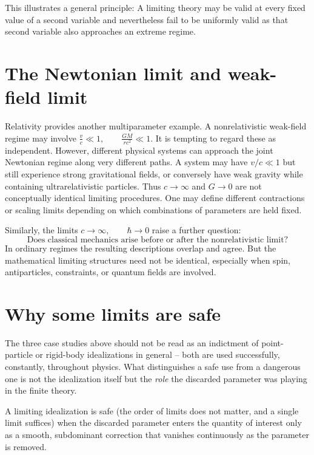 This illustrates a general principle:
 A limiting theory may be valid at every fixed value of a second variable and nevertheless fail to be uniformly valid as that second variable also approaches an extreme regime.

\section{ The Newtonian limit and weak-field limit}
Relativity provides another multiparameter example.
A nonrelativistic weak-field regime may involve
$\frac{v}{c}\ll 1,\qquad \frac{GM}{rc^2}\ll 1$.
It is tempting to regard these as independent.
However, different physical systems can approach the joint Newtonian regime along very different paths.
A system may have $v/c\ll 1$ but still experience strong gravitational fields, or conversely 
have weak gravity while containing ultrarelativistic particles.
Thus $c\rightarrow\infty$ and $G\rightarrow 0$
are not conceptually identical limiting procedures.
One may define different contractions or scaling limits depending on which combinations of parameters are held fixed.

Similarly, the limits $c\rightarrow\infty,\qquad\hbar\rightarrow 0$
raise a further question:
\[\text{Does classical mechanics arise before or after the nonrelativistic limit?}\]
In ordinary regimes the resulting descriptions overlap and agree. But the mathematical limiting structures need not be identical, especially when spin, antiparticles, constraints, or quantum fields are involved.
\section{Why some limits are safe}
\label{limits:safe}
The three case studies above should not be read as an indictment
of point-particle or rigid-body idealizations in general -- both
are used successfully, constantly, throughout physics. What
distinguishes a safe use from a dangerous one is not the
idealization itself but the \emph{role} the discarded parameter
was playing in the finite theory.

\begin{principle}
A limiting idealization is safe (the order of limits does not
    matter, and a single limit suffices) when the discarded
    parameter enters the quantity of interest only as a smooth,
    subdominant correction that vanishes continuously as the
    parameter is removed.
\end{principle}

